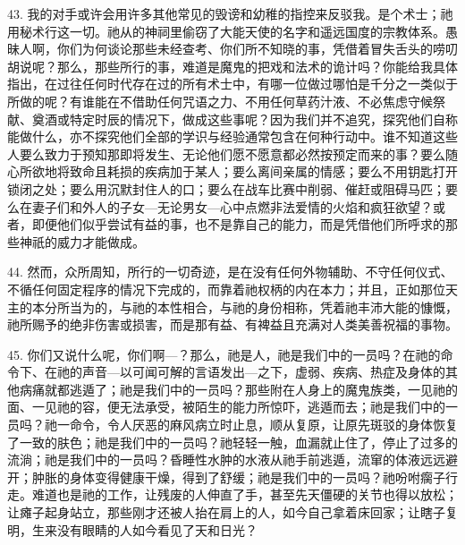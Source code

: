 43. 我的对手或许会用许多其他常见的毁谤和幼稚的指控来反驳我。是个术士；祂用秘术行这一切。祂从的神祠里偷窃了大能天使的名字和遥远国度的宗教体系。愚昧人啊，你们为何谈论那些未经查考、你们所不知晓的事，凭借着冒失舌头的唠叨胡说呢？那么，那些所行的事，难道是魔鬼的把戏和法术的诡计吗？你能给我具体指出，在过往任何时代存在过的所有术士中，有哪一位做过哪怕是千分之一类似于所做的呢？有谁能在不借助任何咒语之力、不用任何草药汁液、不必焦虑守候祭献、奠酒或特定时辰的情况下，做成这些事呢？因为我们并不追究，探究他们自称能做什么，亦不探究他们全部的学识与经验通常包含在何种行动中。谁不知道这些人要么致力于预知那即将发生、无论他们愿不愿意都必然按预定而来的事？要么随心所欲地将致命且耗损的疾病加于某人；要么离间亲属的情感；要么不用钥匙打开锁闭之处；要么用沉默封住人的口；要么在战车比赛中削弱、催赶或阻碍马匹；要么在妻子们和外人的子女---无论男女---心中点燃非法爱情的火焰和疯狂欲望？或者，即便他们似乎尝试有益的事，也不是靠自己的能力，而是凭借他们所呼求的那些神祇的威力才能做成。\par

44. 然而，众所周知，所行的一切奇迹，是在没有任何外物辅助、不守任何仪式、不循任何固定程序的情况下完成的，而靠着祂权柄的内在本力；并且，正如那位天主的本分所当为的，与祂的本性相合，与祂的身份相称，凭着祂丰沛大能的慷慨，祂所赐予的绝非伤害或损害，而是那有益、有裨益且充满对人类美善祝福的事物。\par

45. 你们又说什么呢，你们啊---？那么，祂是人，祂是我们中的一员吗？在祂的命令下、在祂的声音---以可闻可解的言语发出---之下，虚弱、疾病、热症及身体的其他病痛就都逃遁了；祂是我们中的一员吗？那些附在人身上的魔鬼族类，一见祂的面、一见祂的容，便无法承受，被陌生的能力所惊吓，逃遁而去；祂是我们中的一员吗？祂一命令，令人厌恶的麻风病立时止息，顺从复原，让原先斑驳的身体恢复了一致的肤色；祂是我们中的一员吗？祂轻轻一触，血漏就止住了，停止了过多的流淌；祂是我们中的一员吗？昏睡性水肿的水液从祂手前逃遁，流窜的体液远远避开；肿胀的身体变得健康干燥，得到了舒缓；祂是我们中的一员吗？祂吩咐瘸子行走。难道也是祂的工作，让残废的人伸直了手，甚至先天僵硬的关节也得以放松；让瘫子起身站立，那些刚才还被人抬在肩上的人，如今自己拿着床回家；让瞎子复明，生来没有眼睛的人如今看见了天和日光？\par

